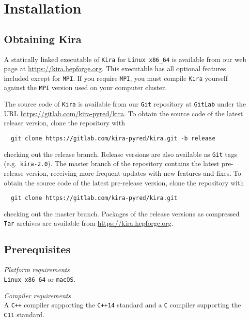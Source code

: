 \documentclass[11pt,a4paper,DIV=11,numbers=noenddot,parskip=half]{scrartcl}
\newcommand{\code}[1]{\texttt{#1}}
\newcommand*{\kira}{\code{Kira}}
\newcommand*{\git}{\code{Git}}
\newcommand*{\gitlab}{\code{GitLab}}
\begin{document}
\section{Installation}
\label{sect:installation}

\subsection{Obtaining Kira}

A statically linked executable of \kira{} for \code{Linux x86\_64} is available from our web page at \url{https://kira.hepforge.org}.
This executable has all optional features included except for \code{MPI}.
If you require \code{MPI}, you must compile \kira{} yourself against the \code{MPI} version used on your computer cluster.

The source code of \kira{} is available from our \git{} repository at
\gitlab{} under the URL \url{https://gitlab.com/kira-pyred/kira}.
To obtain the source code of the latest release version, clone the repository
with
\begin{verbatim}
  git clone https://gitlab.com/kira-pyred/kira.git -b release
\end{verbatim}
checking out the release branch.
Release versions are also available as \git{} tags (e.g.\ \code{kira-2.0}).
The master branch of the repository contains the latest pre-release version,
receiving more frequent updates with new features and fixes.
To obtain the source code of the latest pre-release version, clone the
repository with
\begin{verbatim}
  git clone https://gitlab.com/kira-pyred/kira.git
\end{verbatim}
checking out the master branch.
Packages of the release versions as compressed \code{Tar} archives are
available from \url{https://kira.hepforge.org}.


\subsection{Prerequisites}
\label{sect:prerequisites}

\noindent
\textit{Platform requirements}\smallskip\\
\code{Linux x86\_64} or \code{macOS}.

\medskip\pagebreak[2]
\noindent
\textit{Compiler requirements}\smallskip\\
A \code{C++} compiler supporting the \code{C++14} standard and a \code{C}
compiler supporting the \code{C11} standard.
\end{document}

